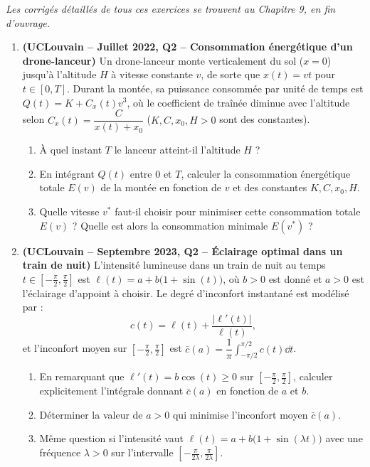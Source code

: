 \emph{Les corrigés détaillés de tous ces exercices se trouvent au Chapitre 9, en fin d'ouvrage.}

\begin{enumerate}[label=\textbf{Exercice 5.\arabic* --}]
    \item \textbf{(UCLouvain -- Juillet 2022, Q2 -- Consommation énergétique d'un drone-lanceur)} Un drone-lanceur monte verticalement du sol ($x=0$) jusqu'à l'altitude $H$ à vitesse constante $v$, de sorte que $x(t) = vt$ pour $t \in [0, T]$. Durant la montée, sa puissance consommée par unité de temps est $Q(t) = K + C_x(t)v^3$, où le coefficient de traînée diminue avec l'altitude selon $C_x(t) = \dfrac{C}{x(t) + x_0}$ ($K, C, x_0, H > 0$ sont des constantes).
    \begin{enumerate}
        \item À quel instant $T$ le lanceur atteint-il l'altitude $H$ ?
        \item En intégrant $Q(t)$ entre $0$ et $T$, calculer la consommation énergétique totale $E(v)$ de la montée en fonction de $v$ et des constantes $K, C, x_0, H$.
        \item Quelle vitesse $v^*$ faut-il choisir pour minimiser cette consommation totale $E(v)$ ? Quelle est alors la consommation minimale $E(v^*)$ ?
    \end{enumerate}

    \item \textbf{(UCLouvain -- Septembre 2023, Q2 -- Éclairage optimal dans un train de nuit)} L'intensité lumineuse dans un train de nuit au temps $t \in \left[-\frac{\pi}{2}, \frac{\pi}{2}\right]$ est $\ell(t) = a + b\bigl(1 + \sin(t)\bigr)$, où $b > 0$ est donné et $a > 0$ est l'éclairage d'appoint à choisir. Le degré d'inconfort instantané est modélisé par :
    \[
        c(t) = \ell(t) + \frac{|\ell'(t)|}{\ell(t)},
    \]
    et l'inconfort moyen sur $\left[-\frac{\pi}{2}, \frac{\pi}{2}\right]$ est $\bar{c}(a) = \dfrac{1}{\pi}\displaystyle\int_{-\pi/2}^{\pi/2} c(t)\dd t$.
    \begin{enumerate}
        \item En remarquant que $\ell'(t) = b\cos(t) \ge 0$ sur $\left[-\frac{\pi}{2}, \frac{\pi}{2}\right]$, calculer explicitement l'intégrale donnant $\bar{c}(a)$ en fonction de $a$ et $b$.
        \item Déterminer la valeur de $a > 0$ qui minimise l'inconfort moyen $\bar{c}(a)$.
        \item Même question si l'intensité vaut $\ell(t) = a + b\bigl(1 + \sin(\lambda t)\bigr)$ avec une fréquence $\lambda > 0$ sur l'intervalle $\left[-\frac{\pi}{2\lambda}, \frac{\pi}{2\lambda}\right]$.
    \end{enumerate}


\end{enumerate}
